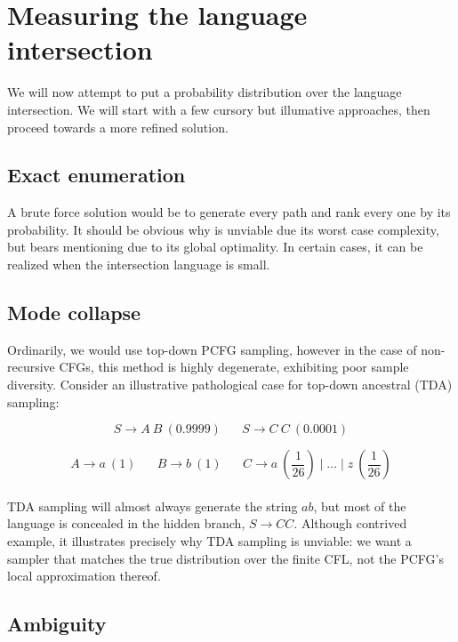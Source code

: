 \documentclass[sigplan,review,acmsmall,nonacm,screen,anonymous]{acmart}\settopmatter{printfolios=false,printccs=false,printacmref=false}
\begin{document}
\section{Measuring the language intersection}

We will now attempt to put a probability distribution over the language intersection. We will start with a few cursory but illumative approaches, then proceed towards a more refined solution.

\subsection{Exact enumeration}

A brute force solution would be to generate every path and rank every one by its probability. It should be obvious why is unviable due its worst case complexity, but bears mentioning due to its global optimality. In certain cases, it can be realized when the intersection language is small.

\subsection{Mode collapse}

Ordinarily, we would use top-down PCFG sampling, however in the case of non-recursive CFGs, this method is highly degenerate, exhibiting poor sample diversity. Consider an illustrative pathological case for top-down ancestral (TDA) sampling:

$$
S \rightarrow A\:B \: (0.9999) \hspace{20pt} S \rightarrow C\:C \: (0.0001)
$$

$$
A \rightarrow a \: (1) \hspace{20pt} B  \rightarrow b \: (1) \hspace{20pt} C  \rightarrow a \: \left(\frac{1}{26}\right) \mid \ldots \mid z \: \left(\frac{1}{26}\right)
$$\\

TDA sampling will almost always generate the string $a b$, but most of the language is concealed in the hidden branch, $S \rightarrow C C$. Although contrived example, it illustrates precisely why TDA sampling is unviable: we want a sampler that matches the true distribution over the finite CFL, not the PCFG's local approximation thereof.

\subsection{Ambiguity}
\end{document}
